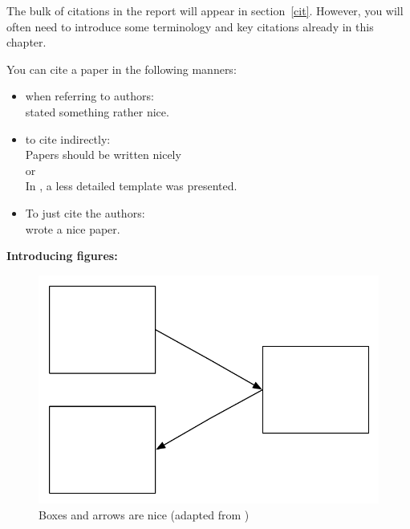 The bulk of citations in the report will appear in section~\ref{cit}. However, you will often need to introduce some terminology and key citations already in this chapter. 

You can cite a paper in the following manners: 

\begin{itemize}
\item when referring to authors:\\
 \citet{authorson10:_secon_best_paper_in_world} stated something rather nice.
\item to cite indirectly: \\
 Papers should be written nicely \citep{authorson10:_secon_best_paper_in_world}\\
or\\
In \cite{authorson10:_secon_best_paper_in_world}, a less detailed template was presented.
\item To just cite the authors: \\
\citeauthor{authorson10:_secon_best_paper_in_world} wrote a nice paper.
\end{itemize}

\vspace{0.5cm}

\noindent
{\bf Introducing figures:} \\

\begin{figure}[ht]
\begin{center}
\includegraphics[width=0.5\columnwidth]{figs/figure1.pdf}
\caption[Boxes and arrows are nice]{Boxes and arrows are nice (adapted from \citet{authorson10:_secon_best_paper_in_world})}
\label{fig:BoxesAndArrowsAreNice}
\end{center}
\end{figure}

